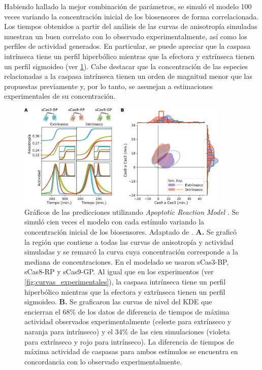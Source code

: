 Habiendo hallado la mejor combinación de parámetros, se simuló el modelo 100 veces variando la concentración inicial de los biosensores de forma correlacionada. Los tiempos obtenidos a partir del análisis de las curvas de anisotropía simuladas muestran un buen correlato con lo observado experimentalmente, así como los perfiles de actividad generados. En particular, se puede apreciar que la caspasa intrínseca tiene un perfil hiperbólico mientras que la efectora y extrínseca tienen un perfil sigmoideo (ver \cref{fig:ARM}). Cabe destacar que la concentración de las especies relacionadas a la caspasa intrínseca tienen un orden de magnitud menor que las propuestas previamente y, por lo tanto, se asemejan a estimaciones experimentales de su concentración.

\begin{figure}
    \centering
    \includegraphics[width=0.9\textwidth]{img/cap_4/arm.png}
    \caption{\footnotesize{Gráficos de las predicciones utilizando \textit{Apoptotic Reaction Model} \citep{Corbat2021}. Se simuló cien veces el modelo con cada estímulo variando la concentración inicial de los biosensores.  Adaptado de \cite{Corbat2021}. \textbf{A.} Se graficó la región que contiene a todas las curvas de anisotropía y actividad simuladas y se remarcó la curva cuya concentración corresponde a la mediana de concentraciones. En el modelado se usaron sCas3-BP, sCas8-RP y sCas9-GP. Al igual que en los experimentos (ver \cref{fig:curvas_experimentales}), la caspasa intrínseca tiene un perfil hiperbólico mientras que la efectora y extrínseca tienen un perfil sigmoideo. \textbf{B.} Se graficaron las curvas de nivel del KDE que encierran el 68\% de los datos de diferencia de tiempos de máxima actividad observados experimentalmente (celeste para extrínseco y naranja  para intrínseco) y el 34\% de las cien simulaciones (violeta para extrínseco y rojo  para intrínseco). La diferencia de tiempos de máxima actividad de caspasas para ambos estímulos se encuentra en concordancia con lo observado experimentalmente.}}
    \label{fig:ARM}
\end{figure}


